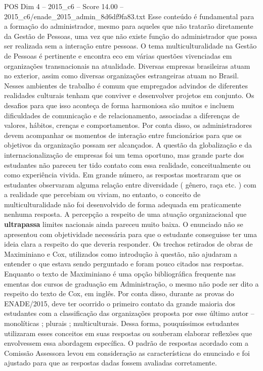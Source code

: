 \begin{textsample}{POS Dim 4 – 2015\_c6 – Score 14.00 – 2015\_c6/enade\_2015\_admin\_8d6df9fa83.txt}
Esse conteúdo é fundamental para a formação do administrador, mesmo para aqueles que não tratarão diretamente da Gestão de Pessoas, uma vez que não existe função do administrador que possa ser realizada sem a interação entre pessoas.
O tema multiculturalidade na Gestão de Pessoas é pertinente e encontra eco em várias questões vivenciadas em organizações transnacionais na atualidade.
Diversas empresas brasileiras atuam no exterior, assim como diversas organizações estrangeiras atuam no Brasil.
Nesses ambientes de trabalho é comum que empregados advindos de diferentes realidades culturais tenham que conviver e desenvolver projetos em conjunto.
Os desafios para que isso aconteça de forma harmoniosa são muitos e incluem dificuldades de comunicação e de relacionamento, associadas a diferenças de valores, hábitos, crenças e comportamentos.
Por conta disso, os administradores devem acompanhar os momentos de interação entre funcionários para que os objetivos da organização possam ser alcançados.
A questão da globalização e da internacionalização de empresas foi um tema oportuno, mas grande parte dos estudantes não pareceu ter tido contato com essa realidade, conceitualmente ou como experiência vivida.
Em grande número, as respostas mostraram que os estudantes observaram alguma relação entre diversidade ( gênero, raça etc. ) com a realidade que percebiam ou viviam, no entanto, o conceito de multiculturalidade não foi desenvolvido de forma adequada em praticamente nenhuma resposta.
A percepção a respeito de uma atuação organizacional que \textbf{ultrapassa} limites nacionais ainda pareceu muito baixa.
O enunciado não se apresentou com objetividade necessária para que o estudante conseguisse ter uma ideia clara a respeito do que deveria responder.
Os trechos retirados de obras de Maximiniano e Cox, utilizados como introdução à questão, não ajudaram a entender o que estava sendo perguntado e foram pouco citados nas respostas.
Enquanto o texto de Maximiniano é uma opção bibliográfica frequente nas ementas dos cursos de graduação em Administração, o mesmo não pode ser dito a respeito do texto de Cox, em inglês.
Por conta disso, durante as provas do ENADE/2015, deve ter ocorrido o primeiro contato da grande maioria dos estudantes com a classificação das organizações proposta por esse último autor – monolíticas ; plurais ; multiculturais.
Dessa forma, pouquíssimos estudantes utilizaram esses conceitos em suas respostas ou souberam elaborar reflexões que envolvessem essa abordagem específica.
O padrão de respostas acordado com a Comissão Assessora levou em consideração as características do enunciado e foi ajustado para que as respostas dadas fossem avaliadas corretamente.

\end{textsample}
